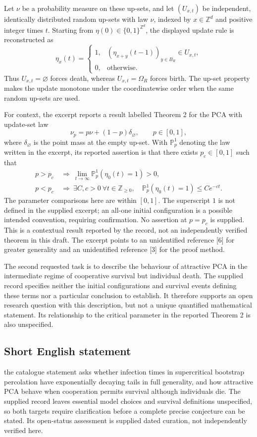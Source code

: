 \documentclass[11pt]{article}
\newcommand{\Z}{\mathbb{Z}}
\begin{document}
Let \(\nu\) be a probability measure on these up-sets, and let \((U_{x,t})\) be independent, identically distributed random up-sets with law \(\nu\), indexed by \(x\in\Z^d\) and positive integer times \(t\). Starting from \(\eta(0)\in\{0,1\}^{\Z^d}\), the displayed update rule is reconstructed as
\[
\eta_x(t)=
\begin{cases}
1,& (\eta_{x+y}(t-1))_{y\in B_R}\in U_{x,t},\\
0,& \text{otherwise}.
\end{cases}
\]
Thus \(U_{x,t}=\varnothing\) forces death, whereas \(U_{x,t}=\Omega_R\) forces birth. The up-set property makes the update monotone under the coordinatewise order when the same random up-sets are used.

For context, the excerpt reports a result labelled Theorem 2 for the PCA with update-set law
\[
\nu_p=p\nu+(1-p)\delta_{\varnothing},\qquad p\in[0,1],
\]
where \(\delta_{\varnothing}\) is the point mass at the empty up-set. With \(\mathbb P_p^1\) denoting the law written in the excerpt, its reported assertion is that there exists \(p_c\in[0,1]\) such that
\[
\begin{aligned}
p>p_c&\ \Longrightarrow\ \lim_{t\to\infty}\mathbb P_p^1(\eta_0(t)=1)>0,\\
p<p_c&\ \Longrightarrow\ \exists C,c>0\ \forall t\in\Z_{\geq0},\quad
\mathbb P_p^1(\eta_0(t)=1)\leq Ce^{-ct}.
\end{aligned}
\]
The parameter comparisons here are within \([0,1]\). The superscript \(1\) is not defined in the supplied excerpt; an all-one initial configuration is a possible intended convention, requiring confirmation. No assertion at \(p=p_c\) is supplied. This is a contextual result reported by the record, not an independently verified theorem in this draft. The excerpt points to an unidentified reference [6] for greater generality and an unidentified reference [3] for the proof method.

The second requested task is to describe the behaviour of attractive PCA in the intermediate regime of cooperative survival but individual death. The supplied record specifies neither the initial configurations and survival events defining these terms nor a particular conclusion to establish. It therefore supports an open research question with this description, but not a unique quantified mathematical statement. Its relationship to the critical parameter in the reported Theorem 2 is also unspecified.
\subsection{Short English statement}
the catalogue statement asks whether infection times in supercritical bootstrap percolation have exponentially decaying tails in full generality, and how attractive PCA behave when cooperation permits survival although individuals die. The supplied record leaves essential model choices and survival definitions unspecified, so both targets require clarification before a complete precise conjecture can be stated. Its open-status assessment is supplied dated curation, not independently verified here.
\end{document}
